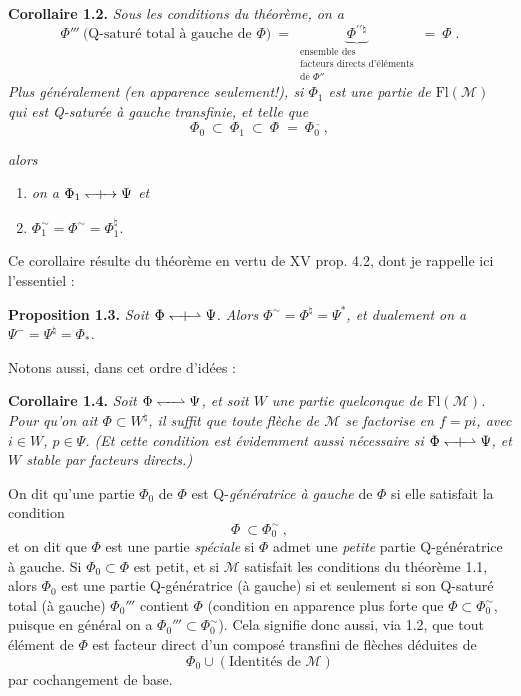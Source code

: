 \documentclass[11pt]{article}
\newcommand{\printedpage}[1]{\marginpar{\footnotesize p.~#1}}
\newcommand{\msp}[1]{\marginpar{\footnotesize [#1]}}
\newcommand{\tld}{\tilde{}}   %
\newcommand{\Qorth}{\mathrel{\leftharpoondown\mkern-6mu\relbar\mkern-6mu\rightharpoonup}}
\newcommand{\Qorthx}{\mathrel{\leftharpoondown\mkern-9mu{+}\mkern-9mu\rightharpoonup}}
\newcommand{\Qorthxfull}{\mathrel{\leftharpoondown\mkern-9mu{+}\mkern-9mu\rightarrow}}
\begin{document}
\bigskip

\textbf{Corollaire 1.2.} \textit{Sous les conditions du théorème, on a}
\[
\Phi''' \ \text{(Q-saturé total à gauche de $\Phi$)} \ = \
\underbrace{\Phi^{\prime\prime\natural}}_{\substack{\text{ensemble des}\\ \text{facteurs directs d'éléments}\\ \text{de $\Phi''$}}}
\ = \ \Phi^{\tld}\ .
\tag*{(1.2.1)}
\]
\textit{Plus généralement (en apparence seulement!), si $\Phi_1$ est une partie de \textup{$\mathrm{Fl}(\mathcal{M})$} qui est \textup{Q}-saturée à gauche transfinie, et telle que}
\[
\Phi_0 \ \subset \ \Phi_1 \ \subset \ \Phi^{\tld} \ = \ \Phi_0{}^{\tld}\ ,
\]

\printedpage{4}

\msp{page 6}
\textit{alors}
\begin{enumerate}[label={}]
\item[a)] \textit{on a $\Phi_1 \Qorthxfull \Psi$ et} %
\item[b)] $\Phi_1^{\sim} = \Phi^{\sim} = \Phi_1^{\natural}$.
\end{enumerate}
Ce corollaire résulte du théorème en vertu de XV prop. 4.2, dont je rappelle ici l'essentiel :

\textbf{Proposition 1.3.} \textit{Soit $\Phi \Qorthx \Psi$. Alors $\Phi^{\sim} = \Phi^{\natural} = \Psi^{*}$, et dualement on a $\Psi^{-} = \Psi^{\natural} = \Phi_{*}$.}

Notons aussi, dans cet ordre d'idées :

\textbf{Corollaire 1.4.} \textit{Soit $\Phi \Qorth \Psi$, et soit $W$ une partie quelconque de $\mathrm{Fl}(\mathcal{M})$. Pour qu'on ait $\Phi \subset W^{\natural}$, il suffit que toute flèche de $\mathcal{M}$ se factorise en $f = pi$, avec $i \in W$, $p \in \Psi$. (Et cette condition est évidemment aussi nécessaire si $\Phi \Qorthx \Psi$, et $W$ stable par facteurs directs.)}

On dit qu'une partie $\Phi_0$ de $\Phi$ est Q-\textit{génératrice à gauche} de $\Phi$ si elle satisfait la condition
\[
\Phi \ \subset \Phi_0^{\sim}\ , \tag*{(1.9)}
\]
et on dit que $\Phi$ est une partie \textit{spéciale} si $\Phi$ admet une \textit{petite} partie Q-génératrice à gauche. Si $\Phi_0 \subset \Phi$ est petit, et si $\mathcal{M}$ satisfait les conditions du théorème 1.1, alors $\Phi_0$ est une partie Q-génératrice (à gauche) si et seulement si son Q-saturé total (à gauche) $\Phi_0'''$ contient $\Phi$ (condition en apparence plus forte que $\Phi \subset \Phi_0^{\sim}$, puisque en général on a $\Phi_0''' \subset \Phi_0^{\sim}$). Cela signifie donc aussi, via 1.2, que tout \msp{page 7} élément de $\Phi$ est facteur direct d'un composé transfini de flèches déduites de
\[
\Phi_0 \cup (\text{Identités de } \mathcal{M})
\]
par cochangement de base.
\end{document}

